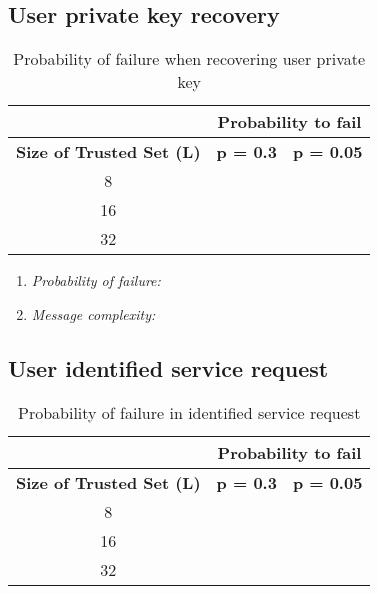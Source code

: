   \subsection{User private key recovery}
  \label{sec:eval_private_key_recovery}
  \begin{table}
    \centering
    \footnotesize
    \begin{tabular}{|c|c|c|}
      \cline{2-3}
      \multicolumn{1}{c|}{}&  \multicolumn{2}{c|}{\textbf{Probability to fail}} \\ \cline{2-3}
      \hline
      \textbf{Size of Trusted Set (L)} & \textbf{p = 0.3} & \textbf{p = 0.05} \\
      \hline \hline
      8 &  &  \\
      \hline
      16 &  &  \\
      \hline
      32 &  &  \\
      \hline
    \end{tabular}
    \caption{Probability of failure when recovering user private key}
    \label{tab:p_private_key_recovery}
  \end{table}

  \begin{enumerate}
    \item{\textit{Probability of failure:}}
    \item{\textit{Message complexity:}}
  \end{enumerate}


  \subsection{User identified service request}
  \label{sec:eval_identified_service_request}
  \begin{table}
    \centering
    \footnotesize
    \begin{tabular}{|c|c|c|}
      \cline{2-3}
      \multicolumn{1}{c|}{}&  \multicolumn{2}{c|}{\textbf{Probability to fail}} \\ \cline{2-3}
      \hline
      \textbf{Size of Trusted Set (L)} & \textbf{p = 0.3} & \textbf{p = 0.05} \\
      \hline \hline
      8 &  &  \\
      \hline
      16 &  &  \\
      \hline
      32 &  &  \\
      \hline
    \end{tabular}
    \caption{Probability of failure in identified service request}
    \label{tab:p_identified_service_request}
  \end{table}
  
